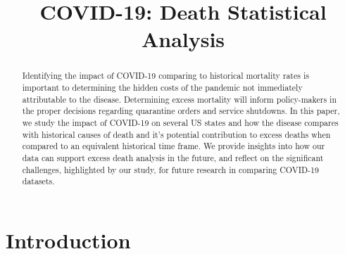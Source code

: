 \documentclass[conference]{IEEEtran}
\begin{document}
\title{COVID-19: Death Statistical Analysis}
\author{
\and
{}
\and
{}
}
\maketitle

\begin{abstract}
Identifying the impact of COVID-19 comparing to historical mortality rates is important to determining the hidden costs of the pandemic not immediately attributable to the disease. 
Determining excess mortality will inform policy-makers in the proper decisions regarding quarantine orders and service shutdowns.
In this paper, we study the impact of COVID-19 on several US states and how the disease compares with historical causes of death and it's potential contribution to excess deaths when compared to an equivalent historical time frame.
We provide insights into how our data can support excess death analysis in the future, and reflect on the significant challenges, highlighted by our study, for future research in comparing COVID-19 datasets.
\end{abstract}

\section{Introduction}
\end{document}
